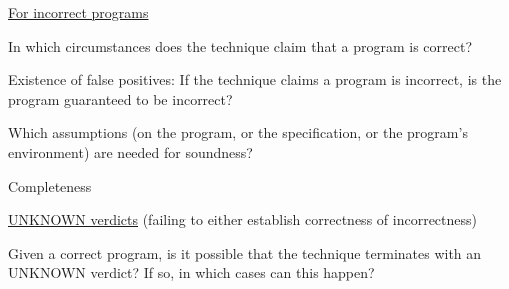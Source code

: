 \documentclass[a4paper]{article}
\begin{document}
\begin{minipage}[t]{0.16\linewidth}
\begin{betterlist}
\begin{betterlist}
\begin{betterlist}
			\end{betterlist}
			\item \underline{For incorrect programs}
			\begin{betterlist}
				\item In which circumstances does the technique claim that a program is correct?

				\item Existence of false positives: If the technique claims a program is incorrect, is the program guaranteed to be incorrect?

			\end{betterlist}
			\item Which assumptions (on the program, or the specification, or the program’s environment) are needed for soundness?
			\framebox[0.90\textwidth][l]{\parbox{0.85\textwidth}{
					\begin{betterlist}
						\item same as CEGAR
					\end{betterlist}
				}}
		\end{betterlist}
		\item \alert{Completeness}
		\begin{betterlist}
			\item \underline{UNKNOWN verdicts} (failing to either establish correctness of incorrectness)
			\begin{betterlist}
				\item Given a correct program, is it possible that the technique terminates with an UNKNOWN verdict? If so, in which cases can this happen?


\end{betterlist}
\end{betterlist}
\end{betterlist}
\end{minipage}
\end{document}
